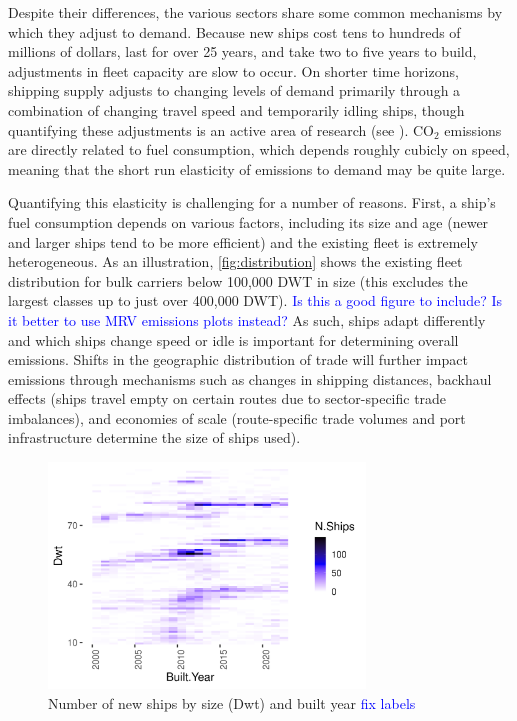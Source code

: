 \documentclass[hidelinks, 12pt,letterpaper]{article}
\begin{document}
Despite their differences, the various sectors share some common mechanisms by which they adjust to demand. Because new ships cost tens to hundreds of millions of dollars, last for over 25 years, and take two to five years to build, adjustments in fleet capacity are slow to occur. On shorter time horizons, shipping supply adjusts to changing levels of demand primarily through a combination of changing travel speed and temporarily idling ships, though quantifying these adjustments is an active area of research (see \citet*{adland2018dynamic, ollila2022effect,assmann2015missing}). CO$_2$ emissions are directly related to fuel consumption, which depends roughly cubicly on speed, meaning that the short run elasticity of emissions to demand may be quite large. 

Quantifying this elasticity is challenging for a number of reasons. First, a ship's fuel consumption depends on various factors, including its size and age (newer and larger ships tend to be more efficient) and the existing fleet is extremely heterogeneous. As an illustration, \autoref{fig:distribution} shows the existing fleet distribution for bulk carriers below 100,000 DWT in size (this excludes the largest classes up to just over 400,000 DWT). 
\textcolor{blue}{Is this a good figure to include? Is it better to use MRV emissions plots instead?} 
As such, ships adapt differently and which ships change speed or idle is important for determining overall emissions.
Shifts in the geographic distribution of trade will further impact emissions through mechanisms such as changes in shipping distances, backhaul effects (ships travel empty on certain routes due to sector-specific trade imbalances), and economies of scale (route-specific trade volumes and port infrastructure determine the size of ships used).


\begin{figure}[h]
  \centering
  \includegraphics[width = 0.75\textwidth]{WFR_Bulkers_Exploration_Size_Built_heatmap.png}
  \caption{Number of new ships by size (Dwt) and built year \textcolor{blue}{fix labels}
}
  \label{fig:distribution}
\end{figure}
\end{document}
